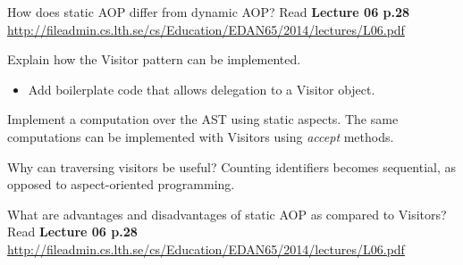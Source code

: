 \documentclass[11pt]{beamer}
\begin{document}
\begin{frame}
\begin{block}{How does static AOP differ from dynamic AOP?}
Read \textbf{Lecture 06 p.28} \url{http://fileadmin.cs.lth.se/cs/Education/EDAN65/2014/lectures/L06.pdf}
\end{block}

\begin{block}{Explain how the Visitor pattern can be implemented. }
\begin{itemize}
\item Add boilerplate code that allows delegation to a Visitor object.
\end{itemize}
\end{block}


\begin{block}{Implement a computation over the AST using static aspects.}
{\tiny }
The same computations can be implemented with Visitors using \textit{accept} methods.
\end{block}

\end{frame}

\begin{frame}


\begin{block}{Why can traversing visitors be useful?}
Counting identifiers becomes sequential, as opposed to aspect-oriented programming.
\end{block}


\begin{block}{What are advantages and disadvantages of static AOP as compared to Visitors?}
Read \textbf{Lecture 06 p.28} \url{http://fileadmin.cs.lth.se/cs/Education/EDAN65/2014/lectures/L06.pdf}
\end{block}
\end{frame}
\end{document}
